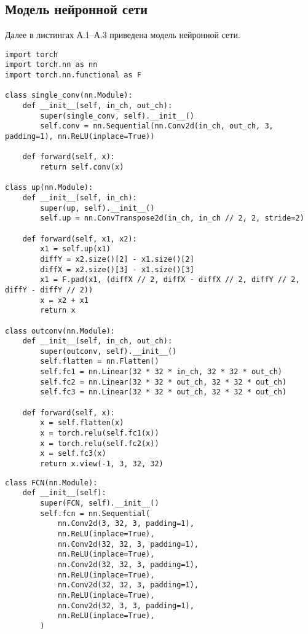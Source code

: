 \begin{appendices}

\chapter{Модель нейронной сети}

Далее в листингах А.1--А.3 приведена модель нейронной сети.

\begin{lstlisting}[caption={Модель нейронной сети (часть 1)}]
import torch
import torch.nn as nn
import torch.nn.functional as F

class single_conv(nn.Module):
    def __init__(self, in_ch, out_ch):
        super(single_conv, self).__init__()
        self.conv = nn.Sequential(nn.Conv2d(in_ch, out_ch, 3, padding=1), nn.ReLU(inplace=True))

    def forward(self, x):
        return self.conv(x)

class up(nn.Module):
    def __init__(self, in_ch):
        super(up, self).__init__()
        self.up = nn.ConvTranspose2d(in_ch, in_ch // 2, 2, stride=2)

    def forward(self, x1, x2):
        x1 = self.up(x1)
        diffY = x2.size()[2] - x1.size()[2]
        diffX = x2.size()[3] - x1.size()[3]
        x1 = F.pad(x1, (diffX // 2, diffX - diffX // 2, diffY // 2, diffY - diffY // 2))
        x = x2 + x1
        return x

class outconv(nn.Module):
    def __init__(self, in_ch, out_ch):
        super(outconv, self).__init__()
        self.flatten = nn.Flatten()
        self.fc1 = nn.Linear(32 * 32 * in_ch, 32 * 32 * out_ch)
        self.fc2 = nn.Linear(32 * 32 * out_ch, 32 * 32 * out_ch)
        self.fc3 = nn.Linear(32 * 32 * out_ch, 32 * 32 * out_ch)

    def forward(self, x):
        x = self.flatten(x)
        x = torch.relu(self.fc1(x))
        x = torch.relu(self.fc2(x))
        x = self.fc3(x)
        return x.view(-1, 3, 32, 32)
\end{lstlisting}

\clearpage

\begin{lstlisting}[caption={Модель нейронной сети (часть 2)}]
class FCN(nn.Module):
    def __init__(self):
        super(FCN, self).__init__()
        self.fcn = nn.Sequential(
            nn.Conv2d(3, 32, 3, padding=1),
            nn.ReLU(inplace=True),
            nn.Conv2d(32, 32, 3, padding=1),
            nn.ReLU(inplace=True),
            nn.Conv2d(32, 32, 3, padding=1),
            nn.ReLU(inplace=True),
            nn.Conv2d(32, 32, 3, padding=1),
            nn.ReLU(inplace=True),
            nn.Conv2d(32, 3, 3, padding=1),
            nn.ReLU(inplace=True),
        )


\end{lstlisting}
\end{appendices}
